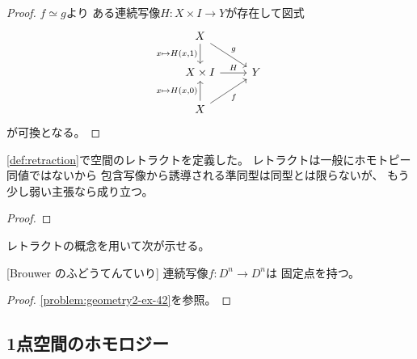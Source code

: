 \documentclass[report]{jlreq}
\begin{document}
\begin{proof}
    $f \simeq g$より
    ある連続写像$H \colon X \times I \to Y$が存在して図式
    \begin{equation}
        \begin{tikzcd}
            X \ar{d}[swap]{x \mapsto H(x, 1)} \ar{rd}{g} \\
            X \times I \ar{r}{H}
                & Y \\
            X \ar{u}{x \mapsto H(x, 0)} \ar{ru}[swap]{f}
        \end{tikzcd}
    \end{equation}
    が可換となる。
    \TODO{}
\end{proof}

\cref{def:retraction}で空間のレトラクトを定義した。
レトラクトは一般にホモトピー同値ではないから
包含写像から誘導される準同型は同型とは限らないが、
もう少し弱い主張なら成り立つ。

\begin{proposition}[レトラクトの包含準同型は単射]
    \TODO{}
\end{proposition}

\begin{proof}
    \TODO{}
\end{proof}

レトラクトの概念を用いて次が示せる。

\begin{theorem}
    [Brouwer のふどうてんていり]
    連続写像$f \colon D^n \to D^n$は
    固定点を持つ。
\end{theorem}

\begin{proof}
    \cref{problem:geometry2-ex-42}を参照。
\end{proof}

\subsection{1点空間のホモロジー}

\end{document}
